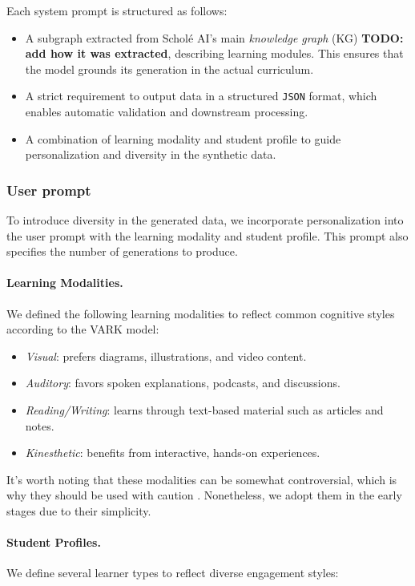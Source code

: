 \documentclass[sigconf]{acmart}
\begin{document}
Each system prompt is structured as follows:
\begin{itemize}
    \item A subgraph extracted from Schol\'e AI's main \textit{knowledge graph} (KG) \textbf{TODO: add how it was extracted}, describing learning modules. This ensures that the model grounds its generation in the actual curriculum.
    \item A strict requirement to output data in a structured \texttt{JSON} format, which enables automatic validation and downstream processing.
    \item A combination of learning modality and student profile to guide personalization and diversity in the synthetic data.
\end{itemize}

\subsubsection{User prompt} To introduce diversity in the generated data, we incorporate personalization into the user prompt with the learning modality and student profile. This prompt also specifies the number of generations to produce.

\paragraph{Learning Modalities.}  
We defined the following learning modalities to reflect common cognitive styles according to the VARK model:

{\small
\begin{itemize}
    \item \textit{Visual}: prefers diagrams, illustrations, and video content.
    \item \textit{Auditory}: favors spoken explanations, podcasts, and discussions.
    \item \textit{Reading/Writing}: learns through text-based material such as articles and notes.
    \item \textit{Kinesthetic}: benefits from interactive, hands-on experiences.
\end{itemize}
}

It's worth noting that these modalities can be somewhat controversial, which is why they should be used with caution \cite{vark-casestudy}. Nonetheless, we adopt them in the early stages due to their simplicity.

\paragraph{Student Profiles.}  
We define several learner types to reflect diverse engagement styles:
\end{document}
